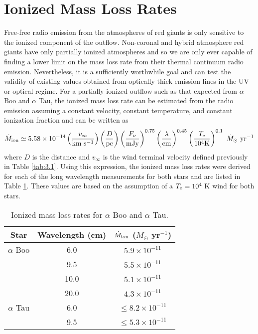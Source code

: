 \section{Ionized Mass Loss Rates}\label{sec:6.5b}

Free-free radio emission from the atmospheres of red giants is only sensitive to the ionized component of the outflow. Non-coronal and hybrid atmosphere red giants have only partially ionized atmospheres and so we are only ever capable of finding a lower limit on the mass loss rate from their thermal continuum radio emission. Nevertheless, it is a sufficiently worthwhile goal and can test the validity of existing values obtained from optically thick emission lines in the UV or optical regime. For a partially ionized outflow such as that expected from $\alpha$ Boo and $\alpha$ Tau, the ionized mass loss rate can be estimated from the radio emission assuming a constant velocity, constant temperature, and constant ionization fraction and can be written as  
\begin{equation}
\dot{M}_{\rm{ion}} \simeq 5.58 \times 10^{-14} \left(\frac{v_{\infty}}{\rm{km \  s^{-1}}}\right) \left(\frac{D}{\rm{pc}}\right)\left( \frac{F_{\nu}}{\rm{mJy}} \right)^{0.75} \left( \frac{\lambda}{\rm{cm}} \right)^{0.45} \left( \frac{T_{\rm{e}}}{10^4 \rm{K}} \right)^{0.1} \ \dot{M}_{\odot} \ \rm{yr}^{-1} 
\label{eq:6.5b}
\end{equation}
where $D$ is the distance and $v_{\infty}$ is the wind terminal velocity defined previously in Table \ref{tab:3.1}. Using this expression, the ionized mass loss rates were derived for each of the long wavelength measurements for both stars and are listed in Table \ref{tab:6.5b}. These values are based on the assumption of a $T_{\rm{e}} = 10^4 \ \rm{K}$  wind for both stars. 

\begin{table}[!hb]
\begin{center}
\caption[Ionized mass loss rates for $\alpha$ Boo and $\alpha$ Tau.]
{Ionized mass loss rates for $\alpha$ Boo and $\alpha$ Tau.}
\begin{tabular}{ccc}
\hline
\hline
\rule{0pt}{2.5ex}Star & Wavelength (cm) & $\dot{M} _{\rm{ion}}$ ($M _{\odot}$ yr$^{-1}$) \\
\hline
\rule{0pt}{2.5ex}$\alpha$ Boo				& 6.0  & $5.9 \times 10^{-11}$ \\
							& 9.5  & $5.5 \times 10^{-11}$ \\
							& 10.0  & $5.1 \times 10^{-11}$ \\
							& 20.0  & $4.3 \times 10^{-11}$ \\
$\alpha$ Tau				& 6.0  & $\leq 8.2 \times 10^{-11}$ \\
							& 9.5 & $\leq 5.3 \times 10^{-11}$ \\
\hline
\end{tabular}
\label{tab:6.5b}
\end{center}
\end{table}

